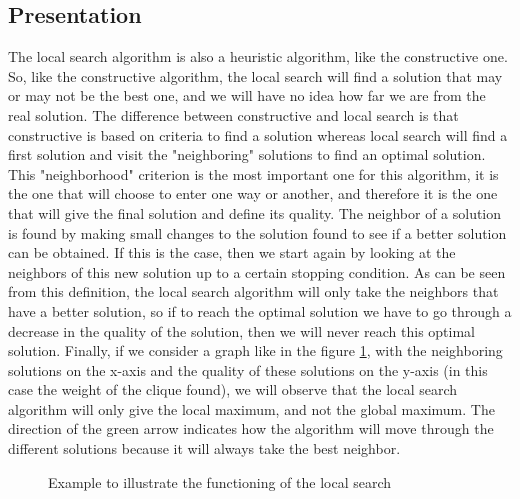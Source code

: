 
\subsection{Presentation}

The local search algorithm is also a heuristic algorithm, like the constructive one. 
So, like the constructive algorithm, the local search will find a solution that may 
or may not be the best one, and we will have no idea how far we are from the real 
solution. The difference between constructive and local search is that constructive 
is based on criteria to find a solution whereas local search will find a first 
solution and visit the "neighboring" solutions to find an optimal solution. This 
"neighborhood" criterion is the most important one for this algorithm, it is the 
one that will choose to enter one way or another, and therefore it is the one that 
will give the final solution and define its quality. The neighbor of a solution is 
found by making small changes to the solution found to see if a better solution can 
be obtained. If this is the case, then we start again by looking at the neighbors 
of this new solution up to a certain stopping condition. As can be seen from this 
definition, the local search algorithm will only take the neighbors that have a 
better solution, so if to reach the optimal solution we have to go through a decrease 
in the quality of the solution, then we will never reach this optimal solution. 
Finally, if we consider a graph like in the figure \ref{fig:local_search_example}, with the neighboring solutions on the x-axis and 
the quality of these solutions on the y-axis (in this case the weight of the clique 
found), we will observe that the local search algorithm will only give the local 
maximum, and not the global maximum. The direction of the green arrow indicates how the algorithm will move through the different solutions because it will always take the best neighbor.

\begin{figure}[H]
    \centering
    \caption{Example to illustrate the functioning of the local search}
    \label{fig:local_search_example}
\end{figure}

